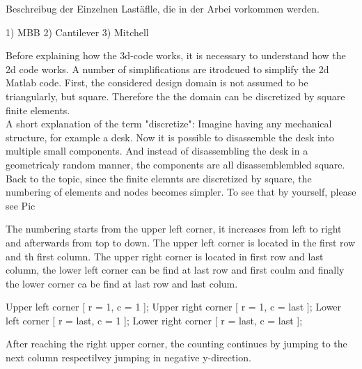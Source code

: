 \documentclass[11 pt]{article}
\begin{document}
Beschreibug der Einzelnen Lastäflle, die in der Arbei vorkommen werden.

1) MBB
2) Cantilever
3)  Mitchell

Before explaining how the 3d-code works, it is necessary to understand how the 2d code works. A number of simplifications are itrodcued to simplify the  2d Matlab code. First, the  considered design domain is not assumed to be triangularly, but square. Therefore the the domain can be discretized by square finite elements.\\
A short explanation of the term "discretize": Imagine having any  mechanical structure, for example a desk. Now it is possible to disassemble the desk into multiple small components. And instead of disassembling  the desk in a geometricaly random manner, the components are all disassemblembled square.\\

Back to the topic, since the finite elemnts are discretized by square, the numbering of elements and nodes becomes simpler. To see that by yourself, please see Pic


The numbering starts from the upper left corner, it increases from left to right and afterwards from top to down. The upper left corner is located in the first row and th first column. The  upper right corner is located in  first row and last column, the lower left corner can be find at  last row and first coulm and finally the lower corner ca be find at last row and last colum.


Upper left corner [ r = 1, c = 1 ];
Upper right corner [ r = 1, c = last ];
Lower left corner [ r = last, c = 1 ];
Lower right corner [ r = last, c = last ];

 After reaching the right upper corner, the counting continues  by jumping to the next column respectilvey jumping in  negative y-direction. 
\end{document}
